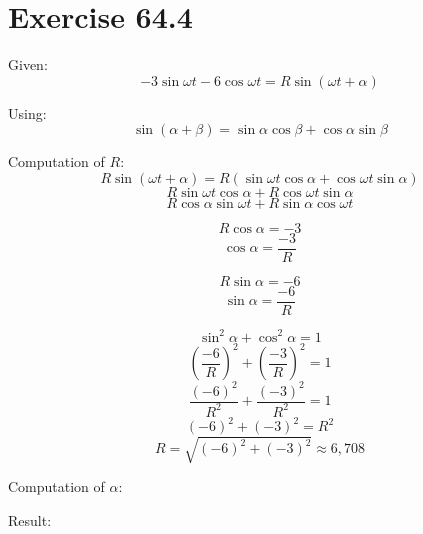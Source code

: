 \documentclass[a4paper, 10pt]{scrartcl}
\begin{document}
\section{Exercise 64.4}

Given:
\[-3\sin{\omega t} - 6\cos{\omega t} = R\sin{(\omega t + \alpha)}\]

Using:
\[\sin{(\alpha + \beta)} = \sin{\alpha}\cos{\beta} + \cos{\alpha}\sin{\beta}\]

Computation of $R$:
\[R\sin{(\omega t + \alpha)} =
R(\sin{\omega t}\cos{\alpha} + \cos{\omega t}\sin{\alpha})\]
\[R\sin{\omega t}\cos{\alpha} + R\cos{\omega t}\sin{\alpha}\]
\[R\cos{\alpha}\sin{\omega t} + R\sin{\alpha}\cos{\omega t}\]

\[R\cos{\alpha} = -3\]
\[\cos{\alpha} = \frac{-3}{R}\]

\[R\sin{\alpha} = -6\]
\[\sin{\alpha} = \frac{-6}{R}\]

\[\sin^{2}{\alpha} + \cos^{2}{\alpha} = 1\]
\[\left(\frac{-6}{R}\right)^{2} + \left(\frac{-3}{R}\right)^{2} = 1\]
\[\frac{(-6)^{2}}{R^{2}} + \frac{(-3)^{2}}{R^{2}} = 1\]
\[(-6)^{2} + (-3)^{2} = R^{2}\]
\[R = \sqrt{(-6)^{2} + (-3)^{2}} \approx 6,708\]

Computation of $\alpha$:

Result:
\end{document}
